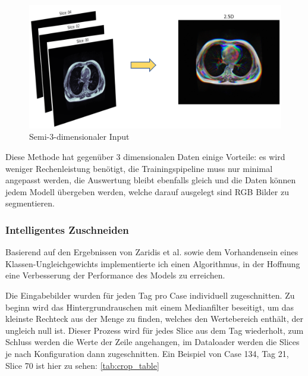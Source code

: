 \begin{figure}[htb]
	\begin{center}
		\includegraphics[width=450pt]{bilder/25d_input}
		\caption{Semi-3-dimensionaler Input}\label{Fig:25d-data}
	\end{center}
\end{figure}

Diese Methode hat gegenüber 3 dimensionalen Daten einige Vorteile: es wird weniger Rechenleistung benötigt, die Trainingspipeline muss nur minimal angepasst werden, die Auswertung bleibt ebenfalls gleich und die Daten können jedem Modell übergeben werden, welche darauf ausgelegt sind RGB Bilder zu segmentieren.

\subsubsection{Intelligentes Zuschneiden}

Basierend auf den Ergebnissen von Zaridis et al. sowie dem Vorhandensein eines Klassen-Ungleichgewichts implementierte ich einen Algorithmus, in der Hoffnung eine Verbesserung der Performance des Models zu erreichen.

Die Eingabebilder wurden für jeden Tag pro Case individuell zugeschnitten. Zu beginn wird das Hintergrundrauschen mit einem Medianfilter beseitigt, um das kleinste Rechteck aus der Menge zu finden, welches den Wertebereich enthält, der ungleich null ist. Dieser Prozess wird für jedes Slice aus dem Tag wiederholt, zum Schluss werden die Werte der Zeile angehangen, im Dataloader werden die Slices je nach Konfiguration dann zugeschnitten. Ein Beispiel von Case 134, Tag 21, Slice 70 ist hier zu sehen: \autoref{tab:crop_table} 

\begin{table}[H]
 \begin{center}
\caption{Ausschnitt aus der Zuschnitt-Tabelle}\label{tab:crop_table}
 \end{center}
 \end{table}
 
